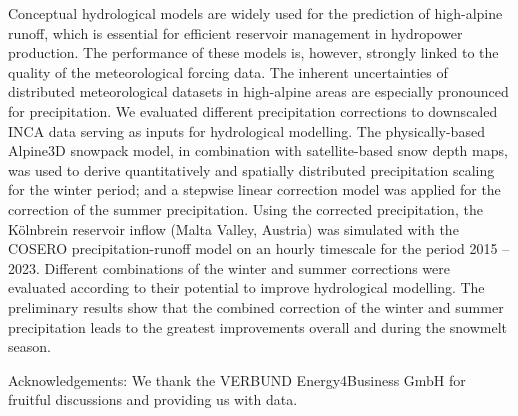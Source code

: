 Conceptual hydrological models are widely used for the prediction of high-alpine runoff, which is essential for efficient reservoir management in hydropower production. The performance of these models is, however, strongly linked to the quality of the meteorological forcing data. The inherent uncertainties of distributed meteorological datasets in high-alpine areas are especially pronounced for precipitation. We evaluated different precipitation corrections to downscaled INCA data serving as inputs for hydrological modelling. The physically-based Alpine3D snowpack model, in combination with satellite-based snow depth maps, was used to derive quantitatively and spatially distributed precipitation scaling for the winter period; and a stepwise linear correction model was applied for the correction of the summer precipitation. Using the corrected precipitation, the Kölnbrein reservoir inflow (Malta Valley, Austria) was simulated with the COSERO precipitation-runoff model on an hourly timescale for the period 2015 – 2023. Different combinations of the winter and summer corrections were evaluated according to their potential to improve hydrological modelling. The preliminary results show that the combined correction of the winter and summer precipitation leads to the greatest improvements overall and during the snowmelt season.

Acknowledgements: We thank the VERBUND Energy4Business GmbH for fruitful discussions and providing us with data.
\newpage{}
{}
\begin{flushleft}





\end{flushleft}

\noindent


